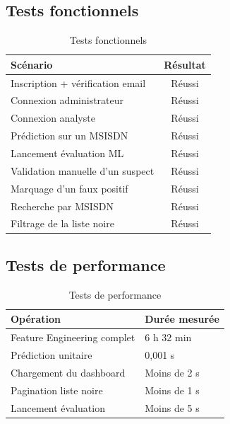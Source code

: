 \documentclass[12pt, oneside, a4paper]{report}
\begin{document}
\subsection{Tests fonctionnels}
\begin{table}[htbp]
\centering
\caption{Tests fonctionnels}
\label{tab:tests-fonctionnels}
\vspace{0.3cm}
\renewcommand{\arraystretch}{1.3}
\begin{tabular}{|l|c|}
\hline
\textbf{Scénario} & \textbf{Résultat} \\
\hline
Inscription + vérification email & Réussi \\
\hline
Connexion administrateur & Réussi \\
\hline
Connexion analyste & Réussi \\
\hline
Prédiction sur un MSISDN & Réussi \\
\hline
Lancement évaluation ML & Réussi \\
\hline
Validation manuelle d'un suspect & Réussi \\
\hline
Marquage d'un faux positif & Réussi \\
\hline
Recherche par MSISDN & Réussi \\
\hline
Filtrage de la liste noire & Réussi \\
\hline
\end{tabular}
\end{table}

\subsection{Tests de performance}
\begin{table}[htbp]
\centering
\caption{Tests de performance}
\label{tab:tests-perf}
\vspace{0.3cm}
\renewcommand{\arraystretch}{1.3}
\begin{tabular}{|l|l|}
\hline
\textbf{Opération} & \textbf{Durée mesurée} \\
\hline
Feature Engineering complet & 6 h 32 min \\
\hline
Prédiction unitaire & 0,001 s \\
\hline
Chargement du dashboard & Moins de 2 s \\
\hline
Pagination liste noire & Moins de 1 s \\
\hline
Lancement évaluation & Moins de 5 s \\
\hline
\end{tabular}
\end{table}
\end{document}
